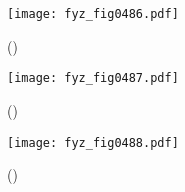    \begin{figure}[ht!] %
      \centering
      \texttt{[image: fyz\_fig0486.pdf]}
      \caption{ 
               (\cite[s.~707]{Feynman01})}
      \label{fyz:fig0486}
    \end{figure}

    \begin{figure}[ht!] %
      \centering
      \texttt{[image: fyz\_fig0487.pdf]}
      \caption{ 
               (\cite[s.~707]{Feynman01})}
      \label{fyz:fig0487}
    \end{figure}

    \begin{figure}[ht!] %
      \centering
      \texttt{[image: fyz\_fig0488.pdf]}
      \caption{ 
               (\cite[s.~707]{Feynman01})}
      \label{fyz:fig0488}
    \end{figure}
    
